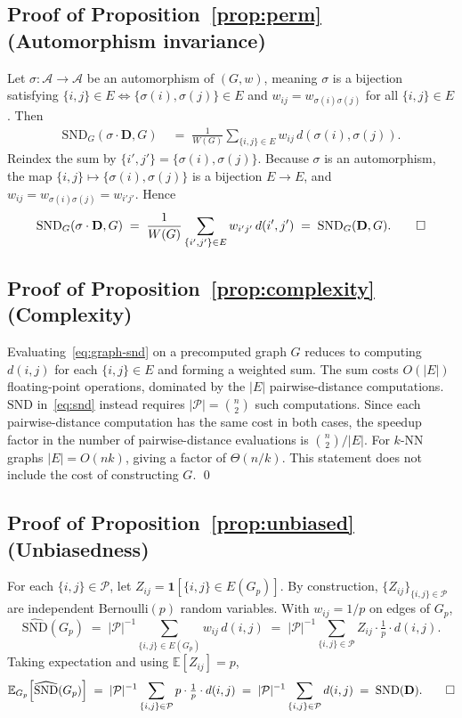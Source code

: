 \documentclass[11pt]{article}
\theoremstyle{plain}
\theoremstyle{definition}
\theoremstyle{remark}
\newcommand{\E}{\mathbb{E}}
\newcommand{\Agents}{\mathcal{A}}        %
\newcommand{\Pairs}{\mathcal{P}}         %
\newcommand{\SND}{\ensuremath{\mathrm{SND}}}
\newcommand{\SNDG}{\mathrm{SND}_{G}}
\newcommand{\ind}{\mathbf{1}}
\begin{document}
\subsection*{Proof of Proposition~\ref{prop:perm} (Automorphism invariance)}

Let $\sigma : \Agents \to \Agents$ be an automorphism of $(G, w)$, meaning
$\sigma$ is a bijection satisfying $\{i,j\} \in E \iff \{\sigma(i),
\sigma(j)\} \in E$ and $w_{ij} = w_{\sigma(i)\sigma(j)}$ for all
$\{i,j\} \in E$. Then
\begin{align*}
\SNDG(\sigma \cdot \mathbf{D}, G)
&\;=\; \frac{1}{W(G)} \sum_{\{i,j\} \in E} w_{ij}\, d(\sigma(i), \sigma(j)).
\end{align*}
Reindex the sum by $\{i', j'\} = \{\sigma(i), \sigma(j)\}$. Because
$\sigma$ is an automorphism, the map $\{i,j\} \mapsto \{\sigma(i),
\sigma(j)\}$ is a bijection $E \to E$, and $w_{ij} =
w_{\sigma(i)\sigma(j)} = w_{i'j'}$. Hence
\[
\SNDG(\sigma \cdot \mathbf{D}, G)
\;=\; \frac{1}{W(G)} \sum_{\{i',j'\} \in E} w_{i'j'}\, d(i', j')
\;=\; \SNDG(\mathbf{D}, G). \qed
\]

\subsection*{Proof of Proposition~\ref{prop:complexity} (Complexity)}

Evaluating~\eqref{eq:graph-snd} on a precomputed graph $G$ reduces to
computing $d(i,j)$ for each $\{i,j\} \in E$ and forming a weighted sum. The
sum costs $O(|E|)$ floating-point operations, dominated by the $|E|$
pairwise-distance computations. $\SND$ in~\eqref{eq:snd} instead requires
$|\Pairs| = \binom{n}{2}$ such computations. Since each pairwise-distance
computation has the same cost in both cases, the speedup factor in the
number of pairwise-distance evaluations is $\binom{n}{2}/|E|$. For $k$-NN
graphs $|E| = O(nk)$, giving a factor of $\Theta(n/k)$. This statement
does not include the cost of constructing $G$. \qed

\subsection*{Proof of Proposition~\ref{prop:unbiased} (Unbiasedness)}

For each $\{i,j\} \in \Pairs$, let $Z_{ij} = \ind[\{i,j\} \in E(G_p)]$.
By construction, $\{Z_{ij}\}_{\{i,j\} \in \Pairs}$ are independent
Bernoulli$(p)$ random variables. With $w_{ij} = 1/p$ on edges of $G_p$,
\[
\widehat{\SND}(G_p)
\;=\; |\Pairs|^{-1} \sum_{\{i,j\} \in E(G_p)} w_{ij}\, d(i,j)
\;=\; |\Pairs|^{-1} \sum_{\{i,j\} \in \Pairs} Z_{ij} \cdot \tfrac{1}{p}
\cdot d(i,j).
\]
Taking expectation and using $\E[Z_{ij}] = p$,
\[
\E_{G_p}\!\left[\widehat{\SND}(G_p)\right]
\;=\; |\Pairs|^{-1} \sum_{\{i,j\} \in \Pairs}
p \cdot \tfrac{1}{p} \cdot d(i,j)
\;=\; |\Pairs|^{-1} \sum_{\{i,j\} \in \Pairs} d(i,j)
\;=\; \SND(\mathbf{D}). \qed
\]
\end{document}
